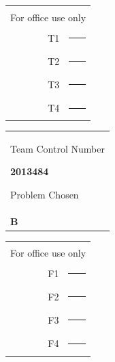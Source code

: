 \documentclass[13pt]{ctexart}
\begin{document}
	\setmainfont{TeX Gyre Pagella}
	\thispagestyle{empty}
	\begin{table}[h]
		\tabcolsep=2pt
		\begin{floatrow}
			\begin{minipage}[t]{7.1cm}
				\raggedright
				\renewcommand\arraystretch{1}
				\begin{tabular}[t]{rp{4em}}
					{ }\\[-8pt]
					\multicolumn{2}{l}{For office use only}\\
					T1 &  \rule{3cm}{0.15mm}\\
					T2 &  \rule{3cm}{0.15mm}\\
					T3 &  \rule{3cm}{0.15mm}\\
					T4 &  \rule{3cm}{0.15mm}\\
				\end{tabular}
			\end{minipage}
			\begin{minipage}[b]{5.4cm}
				\renewcommand\arraystretch{1}
				\begin{tabular}[b]{p{10em}}
					\centering
					{Team Control Number
						
						{\color{red}\fontsize{14pt}{16pt}\selectfont\textbf{{2013484}}}
						
						\vspace{14pt}
						
						\normalsize Problem Chosen	
					}\\[10pt]
					{\color{red}\fontsize{24pt}{10pt}\selectfont\textbf{B}}
				\end{tabular}
			\end{minipage}
			\begin{minipage}[t]{5.4cm}
				\raggedleft
				\renewcommand\arraystretch{1}
				\begin{tabular}[t]{rp{4em}}
					{ }\\[-8pt]
					\multicolumn{2}{l}{For office use only} \\
					F1 &  \rule{3cm}{0.15mm}  \\
					F2 &  \rule{3cm}{0.15mm}  \\
					F3 &  \rule{3cm}{0.15mm}  \\
					F4 &  \rule{3cm}{0.15mm}  \\
				\end{tabular}
			\end{minipage}
		\end{floatrow}
	\end{table}
	\vspace{-18pt}
	\noindent{\rule{\textwidth}{0.1mm}}
	
\end{document}
